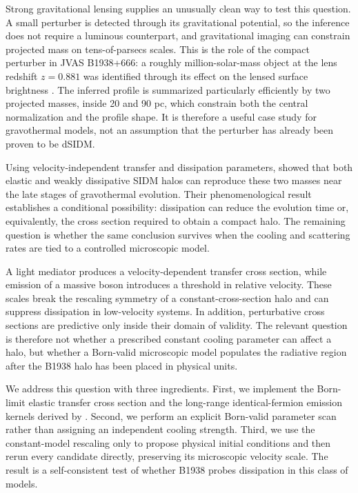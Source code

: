 \documentclass[12pt]{iopart}
\begin{document}
Strong gravitational lensing supplies an unusually clean way to test this
question.  A small perturber is detected through its gravitational potential,
so the inference does not require a luminous counterpart, and gravitational
imaging can constrain projected mass on tens-of-parsecs scales.  This is the
role of the compact perturber in JVAS B1938+666: a roughly million-solar-mass
object at the lens redshift $z=0.881$ was identified through its effect on the
lensed surface brightness \citep{Powell2025,Vegetti2026}.  The inferred
profile is summarized particularly efficiently by two projected masses,
inside 20 and 90 pc, which constrain both the central normalization and the
profile shape.  It is therefore a useful case study for gravothermal models,
not an assumption that the perturber has already been proven to be dSIDM.

Using velocity-independent transfer and dissipation parameters,
\citet{Schmidt2026} showed that both elastic and weakly dissipative SIDM halos
can reproduce these two masses near the late stages of gravothermal
evolution.  Their phenomenological result establishes a conditional
possibility: dissipation can reduce the evolution time or, equivalently, the
cross section required to obtain a compact halo.  The remaining question is
whether the same conclusion survives when the cooling and scattering rates
are tied to a controlled microscopic model.

A light mediator produces a velocity-dependent transfer cross section, while
emission of a massive boson introduces a threshold in relative velocity.
These scales break the rescaling symmetry of a constant-cross-section halo
and can suppress dissipation in low-velocity systems.  In addition,
perturbative cross sections are predictive only inside their domain of
validity.  The relevant question is therefore not whether a prescribed
constant cooling parameter can affect a halo, but whether a Born-valid
microscopic model populates the radiative region after the B1938 halo has been
placed in physical units.

We address this question with three ingredients.  First, we implement the
Born-limit elastic transfer cross section and the long-range
identical-fermion emission kernels derived by
\citet{LankesterBroche2026}.  Second, we perform an explicit Born-valid
parameter scan rather than assigning an independent cooling strength.  Third,
we use the constant-model rescaling only to propose physical initial
conditions and then rerun every candidate directly, preserving its microscopic
velocity scale.  The result is a self-consistent test of whether B1938 probes
dissipation in this class of models.
\end{document}
